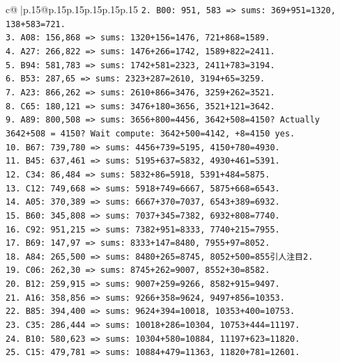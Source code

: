 \documentclass{article}
\begin{document}
{\begin{supertabular}{c@{$\;$}|p{.15\linewidth}@{}p{.15\linewidth}p{.15\linewidth}p{.15\linewidth}p{.15\linewidth}p{.15\linewidth}}
{{{\texttt{2. B00: 951, 583 => sums: 369+951=1320, 138+583=721.} \\
\texttt{3. A08: 156,868 => sums: 1320+156=1476, 721+868=1589.} \\
\texttt{4. A27: 266,822 => sums: 1476+266=1742, 1589+822=2411.} \\
\texttt{5. B94: 581,783 => sums: 1742+581=2323, 2411+783=3194.} \\
\texttt{6. B53: 287,65 => sums: 2323+287=2610, 3194+65=3259.} \\
\texttt{7. A23: 866,262 => sums: 2610+866=3476, 3259+262=3521.} \\
\texttt{8. C65: 180,121 => sums: 3476+180=3656, 3521+121=3642.} \\
\texttt{9. A89: 800,508 => sums: 3656+800=4456, 3642+508=4150? Actually 3642+508 = 4150? Wait compute: 3642+500=4142, +8=4150 yes.} \\
\texttt{10. B67: 739,780 => sums: 4456+739=5195, 4150+780=4930.} \\
\texttt{11. B45: 637,461 => sums: 5195+637=5832, 4930+461=5391.} \\
\texttt{12. C34: 86,484 => sums: 5832+86=5918, 5391+484=5875.} \\
\texttt{13. C12: 749,668 => sums: 5918+749=6667, 5875+668=6543.} \\
\texttt{14. A05: 370,389 => sums: 6667+370=7037, 6543+389=6932.} \\
\texttt{15. B60: 345,808 => sums: 7037+345=7382, 6932+808=7740.} \\
\texttt{16. C92: 951,215 => sums: 7382+951=8333, 7740+215=7955.} \\
\texttt{17. B69: 147,97 => sums: 8333+147=8480, 7955+97=8052.} \\
\texttt{18. A84: 265,500 => sums: 8480+265=8745, 8052+500=855引人注目2.} \\
\texttt{19. C06: 262,30 => sums: 8745+262=9007, 8552+30=8582.} \\
\texttt{20. B12: 259,915 => sums: 9007+259=9266, 8582+915=9497.} \\
\texttt{21. A16: 358,856 => sums: 9266+358=9624, 9497+856=10353.} \\
\texttt{22. B85: 394,400 => sums: 9624+394=10018, 10353+400=10753.} \\
\texttt{23. C35: 286,444 => sums: 10018+286=10304, 10753+444=11197.} \\
\texttt{24. B10: 580,623 => sums: 10304+580=10884, 11197+623=11820.} \\
\texttt{25. C15: 479,781 => sums: 10884+479=11363, 11820+781=12601.} \\
}}}
\end{supertabular}}
\end{document}
